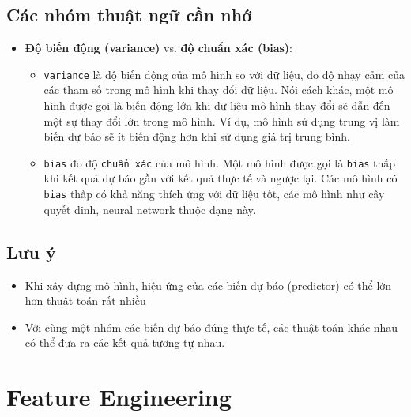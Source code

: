\documentclass[]{krantz}
\providecommand{\tightlist}{%
  \setlength{\itemsep}{0pt}\setlength{\parskip}{0pt}}
\theoremstyle{definition}
\theoremstyle{definition}
\theoremstyle{definition}
\theoremstyle{remark}
\begin{document}
\hypertarget{cac-nhom-thut-ng-cn-nh}{%
\section{Các nhóm thuật ngữ cần nhớ}\label{cac-nhom-thut-ng-cn-nh}}

\begin{itemize}
\tightlist
\item
  \textbf{Độ biến động (variance)} vs. \textbf{độ chuẩn xác (bias)}:

  \begin{itemize}
  \tightlist
  \item
    \texttt{variance} là độ biến động của mô hình so với dữ liệu, đo độ
    nhạy cảm của các tham số trong mô hình khi thay đổi dữ liệu. Nói
    cách khác, một mô hình được gọi là biến động lớn khi dữ liệu mô hình
    thay đổi sẽ dẫn đến một sự thay đổi lớn trong mô hình. Ví dụ, mô
    hình sử dụng trung vị làm biến dự báo sẽ ít biến động hơn khi sử
    dụng giá trị trung bình.
  \item
    \texttt{bias} đo độ \texttt{chuẩn\ xác} của mô hình. Một mô hình
    được gọi là \texttt{bias} thấp khi kết quả dự báo gần với kết quả
    thực tế và ngược lại. Các mô hình có \texttt{bias} thấp có khả năng
    thích ứng với dữ liệu tốt, các mô hình như cây quyết đinh, neural
    network thuộc dạng này.
  \end{itemize}
\end{itemize}

\hypertarget{luu-y}{%
\section{Lưu ý}\label{luu-y}}

\begin{itemize}
\tightlist
\item
  Khi xây dựng mô hình, hiệu ứng của các biến dự báo (predictor) có thể
  lớn hơn thuật toán rất nhiều
\item
  Với cùng một nhóm các biến dự báo đúng thực tế, các thuật toán khác
  nhau có thể đưa ra các kết quả tương tự nhau.
\end{itemize}

\mainmatter

\hypertarget{feature-engineering}{%
\chapter{Feature Engineering}\label{feature-engineering}}
\end{document}
